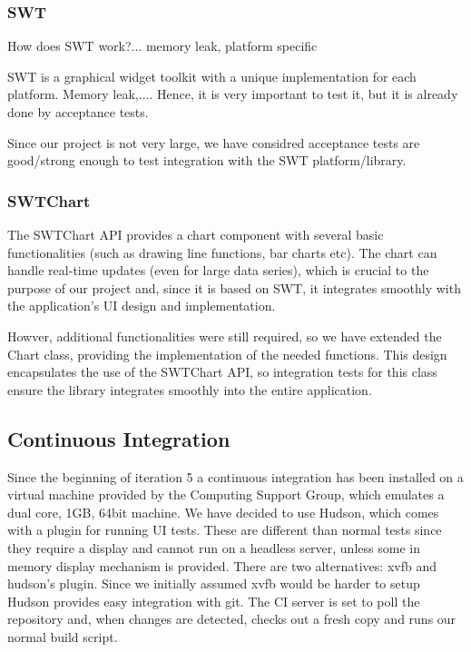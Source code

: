\documentclass[10pt]{article}
\begin{document}
\subsubsection{SWT}

How does SWT work?... memory leak, platform specific

SWT is a graphical widget toolkit with a unique implementation for each platform. Memory leak,....
Hence, it is very important to test it, but it is already done by acceptance tests.

Since our project is not very large, we have considred acceptance tests are good/strong enough to test integration with the SWT platform/library.

\subsubsection{SWTChart}

The SWTChart API provides a chart component with several basic functionalities (such as drawing line functions, bar charts etc). The chart can handle real-time updates (even for large data series), which is crucial to the purpose of our project and, since it is based on SWT, it integrates smoothly with the application's UI design and implementation. 

Howver, additional functionalities were still required, so we have extended the Chart class, providing the implementation of the needed functions. This design encapsulates the use of the SWTChart API, so integration tests for this class ensure the library integrates smoothly into the entire application. 

\subsection{Continuous Integration}

Since the beginning of iteration 5 a continuous integration has been installed on a virtual machine provided by the Computing Support Group, which emulates a dual core, 1GB, 64bit machine.
We have decided to use Hudson, which comes with a plugin for running UI tests. These are different than normal tests since they require a display and cannot run on a headless server, unless some in memory display mechanism is provided. There are two alternatives: xvfb and hudson's plugin. Since we initially assumed xvfb would be harder to setup
Hudson provides easy integration with git.
The CI server is set to poll the repository and, when changes are detected, checks out a fresh copy and runs our normal build script.
\end{document}
